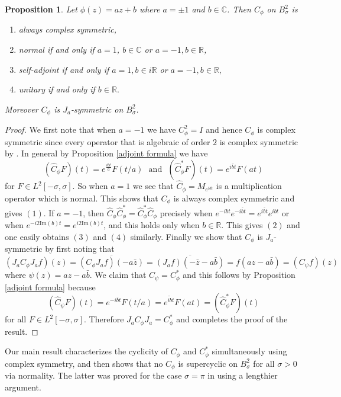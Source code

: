 \documentclass[11pt]{amsart}%
\numberwithin{equation}{section}
\theoremstyle{plain}
\newtheorem{prop}[thm]{Proposition}
\theoremstyle{definition}
\theoremstyle{definition}
\begin{document}
\begin{prop}\label{normal}Let $\phi(z)=az+b$ where $a=\pm1$ and $b\in \mathbb{C}$. Then $C_{\phi}$ on $B^2_{\sigma}$ is
\begin{enumerate}
\item always complex symmetric,
\item normal if and only if $a=1$, $b\in\mathbb{C}$ or $a=-1, b\in \mathbb{R}$,
\item self-adjoint if and only if $a=1,b\in i\mathbb{R}$ or $a=-1,b\in \mathbb{R},$
\item unitary if and only if $b\in \mathbb{R}.$
\end{enumerate}
Moreover $C_\phi$ is $J_a$-symmetric on $B^2_{\sigma}$.
\end{prop}
\begin{proof} We first note that when $a=-1$ we have $C^2_\phi=I$ and hence $C_\phi$ is complex symmetric since every operator that is algebraic of order $2$ is complex symmetric by \cite[Thm. 2]{Garcia 1}. In general by Proposition \ref{adjoint formula} we have \[
(\widehat{C}_\phi F)(t) =e^{\frac{ibt}{a}}F(t/a) \ \ \ \mathrm{and} \ \ \ (\widehat{C}^*_\phi F)(t) =e^{\overline{ibt}}F(at)
\]
for $F\in L^2[-\sigma,\sigma]$. So when $a=1$ we see that $\widehat{C}_\phi=M_{e^{ibt}}$ is a multiplication operator which is normal. This shows that $C_\phi$ is always complex symmetric and gives $(1)$. If $a=-1$, then $\widehat{C}_\phi \widehat{C}_\phi^*=\widehat{C}_\phi ^*\widehat{C}_\phi$ precisely when $e^{-ibt}e^{-\overline{ibt}}=e^{\overline{ibt}}e^{ibt}$ or when $e^{-i2\mathrm{Im}(b)t}=e^{i2\mathrm{Im}(b)t}$, and this holds only when $b\in\mathbb{R}$. This gives $(2)$ and one easily obtains $(3)$ and $(4)$ similarly. Finally we show that $C_\phi$ is $J_a$-symmetric by first noting that
\[
(J_a C_\phi J_af)(z)=\overline{(C_\phi J_af)(-a\bar{z})}=\overline{(J_af)(-\bar{z}-a\bar{b})}=f(az-a\bar{b})=(C_\psi f)(z)
\]
where $\psi(z)=az-a\bar{b}$. We claim that $C_\psi=C_\phi^*$ and this follows by Proposition \ref{adjoint formula} because \[(\widehat{C}_{\psi}F)(t)=e^{-i\bar{b}t}F(t/a)=\overline{e^{ibt}}F(at)=(\widehat{C}_{\phi}^*F)(t)\] for all $F\in L^2[-\sigma,\sigma]$. Therefore $J_a C_\phi J_a=C_\phi^*$ and completes the proof of the result.
\end{proof}



Our main result characterizes the cyclicity of $C_\phi$ and $C_\phi^*$ simultaneously using complex symmetry, and then shows that no $C_\phi$ is supercyclic on $B^2_\sigma$ for all $\sigma>0$ via normality. The latter was proved for the case $\sigma=\pi$ in \cite[Thm. 2.7]{chacon2007composition} using a lengthier argument.
\end{document}
